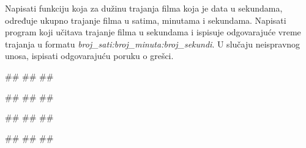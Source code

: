 \begin{Exercise}[label=POK_05] 
Napisati funkciju koja za dužinu trajanja filma koja je data u sekundama, 
određuje ukupno trajanje filma u satima, minutama i sekundama. 
Napisati program koji učitava trajanje filma u sekundama i ispisuje odgovarajuće
vreme trajanja u formatu \textit{broj\_sati:broj\_minuta:broj\_sekundi}.
U slučaju neispravnog unosa, ispisati odgovarajuću poruku o grešci. 

\begin{miditest}
\begin{upotreba}{1}
#\naslovInt#
##
##
\end{upotreba}
\end{miditest}
\begin{miditest}
\begin{upotreba}{2}
#\naslovInt#
##
##
\end{upotreba}
\end{miditest}

\begin{miditest}
\begin{upotreba}{3}
#\naslovInt#
##
##
\end{upotreba}
\end{miditest}
\begin{miditest}
\begin{upotreba}{4}
#\naslovInt#
##
##
\end{upotreba}
\end{miditest}

\end{Exercise}
\ifresenja
\begin{Answer}[ref=POK_05]
\end{Answer}
\fi


